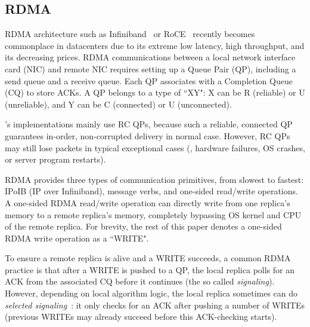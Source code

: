 \subsection{RDMA}\label{sec:rdma}
RDMA architecture such as Infiniband~\cite{infiniband} or RoCE~\cite{roce} 
recently becomes commonplace in datacenters due to its extreme low latency, 
high throughput, and its decreasing prices. RDMA communications between a local 
network interface card (NIC) and remote NIC requires setting up a Queue Pair 
(QP), including a send queue and a receive queue. Each QP associates with a 
Completion Queue (CQ) to store ACKs. A QP belongs to a type of ``XY": X can be R 
(reliable) or U (unreliable), and Y can be C (connected) or U (unconnected). 

\xxx's implementations mainly use RC QPs, because such a reliable, connected QP 
guarantees in-order, non-corrupted delivery in normal case. However, RC QPs may 
still lose packets in typical \paxos exceptional cases (\eg, hardware failures, 
OS crashes, or server program restarts).

RDMA provides three types of communication primitives, from slowest to 
fastest: IPoIB (IP over Infiniband), message verbs, and one-sided read/write 
operations. A one-sided RDMA read/write operation can directly write from one 
replica's memory to a 
remote replica's memory, completely bypassing OS kernel and CPU of the remote 
replica. For brevity, the rest of this paper denotes a one-sided RDMA write 
operation as a ``WRITE".

To ensure a remote replica is alive and a WRITE succeeds, a common RDMA 
practice is that after a WRITE is pushed to a QP, the local replica polls
for an ACK from the associated CQ before it continues (the so called 
\emph{signaling}). However, depending on local algorithm logic, the local 
replica sometimes can do \emph{selected signaling}~\cite{herd:sigcomm14}: it 
only checks for an ACK after pushing a number of WRITEs (previous WRITEs may 
already succeed before this ACK-checking starts).


